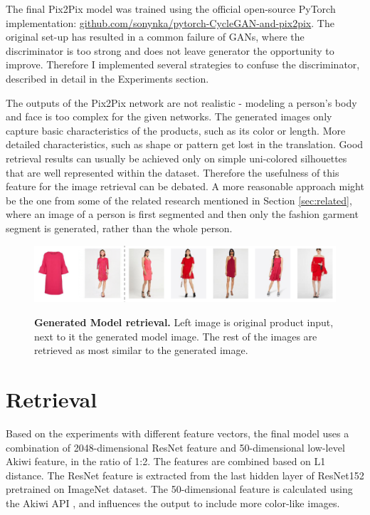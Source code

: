 \documentclass[12pt]{report}
\begin{document}
The final Pix2Pix model was trained using the official open-source PyTorch implementation: \hyperlink{https://github.com/sonynka/pytorch-CycleGAN-and-pix2pix}{github.com/sonynka/pytorch-CycleGAN-and-pix2pix}. The original set-up has resulted in a common failure of GANs, where the discriminator is too strong and does not leave generator the opportunity to improve. Therefore I implemented several strategies to confuse the discriminator, described in detail in the Experiments section.

The outputs of the Pix2Pix network are not realistic - modeling a person's body and face is too complex for the given networks. The generated images only capture basic characteristics of the products, such as its color or length. More detailed characteristics, such as shape or pattern get lost in the translation. Good retrieval results can usually be achieved only on simple uni-colored silhouettes that are well represented within the dataset. Therefore the usefulness of this feature for the image retrieval can be debated. A more reasonable approach might be the one from some of the related research mentioned in Section \ref{sec:related}, where an image of a person is first segmented and then only the fashion garment segment is generated, rather than the whole person.

\begin{figure}[h]
\centering
{\includegraphics[width=\linewidth]{05_results/model_retrieval}}
\caption{\label{fig:model_retrieval} \textbf{Generated Model retrieval.} Left image is original product input, next to it the generated model image. The rest of the images are retrieved as most similar to the generated image.}
\end{figure}

\section{Retrieval}
Based on the experiments with different feature vectors, the final model uses a combination of 2048-dimensional ResNet feature and 50-dimensional low-level Akiwi feature, in the ratio of 1:2. The features are combined based on L1 distance. The ResNet feature is extracted from the last hidden layer of ResNet152 pretrained on ImageNet dataset. The 50-dimensional feature is calculated using the Akiwi API \cite{sonnenberg_akiwi_nodate}, and influences the output to include more color-like images.
\end{document}
